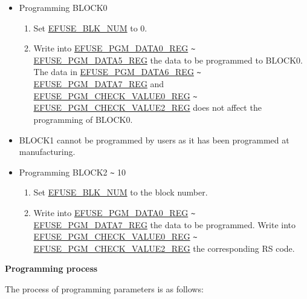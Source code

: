 \documentclass[main\_\_EN.tex]{subfiles}
\begin{document}
\begin{itemize}
    \item Programming BLOCK0
    \begin{enumerate}
        \item Set \hyperref[fielddesc:EFUSEBLKNUM]{EFUSE\_BLK\_NUM} to 0.
        \item Write into \hyperref[regdesc:EFUSEPGMDATANREG]{EFUSE\_PGM\_DATA0\_REG} \verb+~+ \hyperref[regdesc:EFUSEPGMDATANREG]{EFUSE\_PGM\_DATA5\_REG} the data to be programmed to BLOCK0. \\
        The data in \hyperref[regdesc:EFUSEPGMDATANREG]{EFUSE\_PGM\_DATA6\_REG} \verb+~+ \hyperref[regdesc:EFUSEPGMDATANREG]{EFUSE\_PGM\_DATA7\_REG} and \hyperref[regdesc:EFUSEPGMCHECKVALUENREG]{EFUSE\_PGM\_CHECK\_VALUE0\_REG} \verb+~+ \hyperref[regdesc:EFUSEPGMCHECKVALUENREG]{EFUSE\_PGM\_CHECK\_VALUE2\_REG} does not affect the programming of BLOCK0.
    \end{enumerate}
    \item BLOCK1 cannot be programmed by users as it has been programmed at manufacturing.
    \item Programming BLOCK2 \verb+~+ 10
    \begin{enumerate}
        \item Set \hyperref[fielddesc:EFUSEBLKNUM]{EFUSE\_BLK\_NUM} to the block number.
        \item Write into \hyperref[regdesc:EFUSEPGMDATANREG]{EFUSE\_PGM\_DATA0\_REG} \verb+~+ \hyperref[regdesc:EFUSEPGMDATANREG]{EFUSE\_PGM\_DATA7\_REG} the data to be programmed. Write into \hyperref[regdesc:EFUSEPGMCHECKVALUENREG]{EFUSE\_PGM\_CHECK\_VALUE0\_REG}  \verb+~+ \hyperref[regdesc:EFUSEPGMCHECKVALUENREG]{EFUSE\_PGM\_CHECK\_VALUE2\_REG} the corresponding RS code.
    \end{enumerate}
\end{itemize}

{\bfseries Programming process}

The process of programming parameters is as follows:
\end{document}
